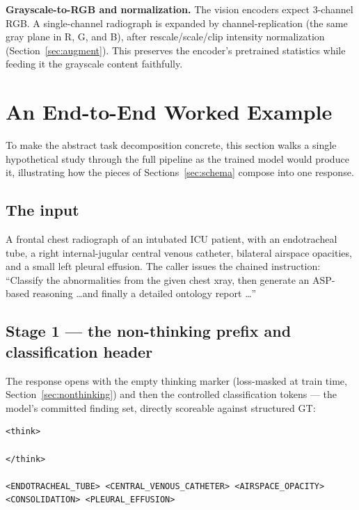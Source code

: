 \documentclass[11pt,a4paper]{article}
\begin{document}
\textbf{Grayscale-to-RGB and normalization.} The vision encoders expect 3-channel RGB. A single-channel radiograph is expanded by channel-replication (the same gray plane in R, G, and B), after rescale/scale/clip intensity normalization (Section~\ref{sec:augment}). This preserves the encoder's pretrained statistics while feeding it the grayscale content faithfully.

\section{An End-to-End Worked Example}
\label{sec:worked}

To make the abstract task decomposition concrete, this section walks a single hypothetical study through the full pipeline as the trained model would produce it, illustrating how the pieces of Sections~\ref{sec:schema} compose into one response.

\subsection{The input}
A frontal chest radiograph of an intubated ICU patient, with an endotracheal tube, a right internal-jugular central venous catheter, bilateral airspace opacities, and a small left pleural effusion. The caller issues the chained instruction: ``Classify the abnormalities from the given chest xray, then generate an ASP-based reasoning \dots and finally a detailed ontology report \dots''

\subsection{Stage 1 --- the non-thinking prefix and classification header}
The response opens with the empty thinking marker (loss-masked at train time, Section~\ref{sec:nonthinking}) and then the controlled classification tokens --- the model's committed finding set, directly scoreable against structured GT:
\begin{lstlisting}
<think>

</think>

<ENDOTRACHEAL_TUBE> <CENTRAL_VENOUS_CATHETER> <AIRSPACE_OPACITY> <CONSOLIDATION> <PLEURAL_EFFUSION>
\end{lstlisting}
\end{document}
